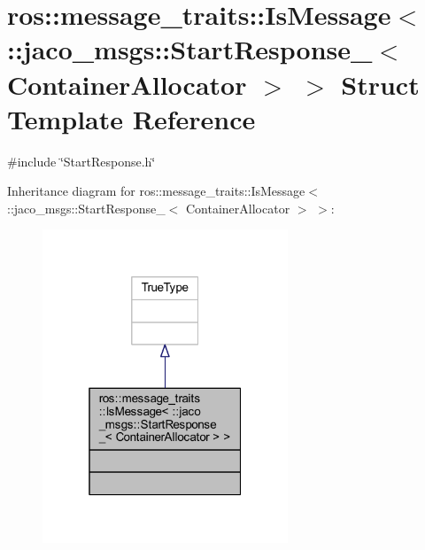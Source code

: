 \hypertarget{structros_1_1message__traits_1_1IsMessage_3_01_1_1jaco__msgs_1_1StartResponse___3_01ContainerAllocator_01_4_01_4}{}\section{ros\+:\+:message\+\_\+traits\+:\+:Is\+Message$<$ \+:\+:jaco\+\_\+msgs\+:\+:Start\+Response\+\_\+$<$ Container\+Allocator $>$ $>$ Struct Template Reference}
\label{structros_1_1message__traits_1_1IsMessage_3_01_1_1jaco__msgs_1_1StartResponse___3_01ContainerAllocator_01_4_01_4}


{\ttfamily \#include \char`\"{}Start\+Response.\+h\char`\"{}}



Inheritance diagram for ros\+:\+:message\+\_\+traits\+:\+:Is\+Message$<$ \+:\+:jaco\+\_\+msgs\+:\+:Start\+Response\+\_\+$<$ Container\+Allocator $>$ $>$\+:
\nopagebreak
\begin{figure}[H]
\begin{center}
\leavevmode
\includegraphics[width=208pt]{d3/d70/structros_1_1message__traits_1_1IsMessage_3_01_1_1jaco__msgs_1_1StartResponse___3_01ContainerAll8d62a071ab9e59809e8572fe6ecac0e1}
\end{center}
\end{figure}


